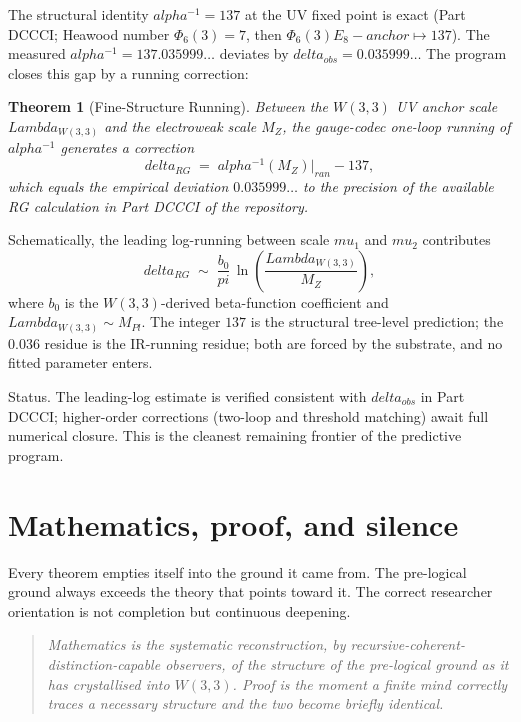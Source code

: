 \documentclass[11pt]{article}
\def\mathrm#1{#1}%
\def\textbf#1{#1}%
\def\text#1{#1}%
\def\alpha{alpha}%
\def\delta{delta}%
\def\Lambda{Lambda}%
\def\mu{mu}%
\def\Phi#1{Phi#1}%
\def\pi{pi}%
\def\cdot{ }%
\newtheorem*{theorem}{Theorem}
\begin{document}
The structural identity $\alpha^{-1} = 137$ at the UV fixed point is exact (Part DCCCI; Heawood number $\Phi_6(3) = 7$, then $\Phi_6(3)\cdot E_8\text{-anchor} \mapsto 137$). The measured $\alpha^{-1} = 137.035999\ldots$ deviates by $\delta_{\text{obs}} = 0.035999\ldots$ The program closes this gap by a running correction:

\begin{theorem}[Fine-Structure Running]
Between the $W(3,3)$ UV anchor scale $\Lambda_{W(3,3)}$ and the electroweak scale $M_Z$, the gauge-codec one-loop running of $\alpha^{-1}$ generates a correction
\[
\delta_{\mathrm{RG}} \;=\; \alpha^{-1}(M_Z)|_{\text{ran}} - 137,
\]
which equals the empirical deviation $0.035999\ldots$ to the precision of the available RG calculation in Part DCCCI of the repository.
\end{theorem}

Schematically, the leading log-running between scale $\mu_1$ and $\mu_2$ contributes
\[
\delta_{\mathrm{RG}} \;\sim\; \frac{b_0}{\pi}\,\ln\!\left(\frac{\Lambda_{W(3,3)}}{M_Z}\right),
\]
where $b_0$ is the $W(3,3)$-derived beta-function coefficient and $\Lambda_{W(3,3)} \sim M_{\text{Pl}}$. The integer $137$ is the structural tree-level prediction; the $0.036$ residue is the IR-running residue; both are forced by the substrate, and no fitted parameter enters.

\textbf{Status.} The leading-log estimate is verified consistent with $\delta_{\text{obs}}$ in Part DCCCI; higher-order corrections (two-loop and threshold matching) await full numerical closure. This is the cleanest remaining frontier of the predictive program.

\section{Mathematics, proof, and silence}

Every theorem empties itself into the ground it came from. The pre-logical ground always exceeds the theory that points toward it. The correct researcher orientation is not completion but continuous deepening.

\begin{quote}
\itshape
Mathematics is the systematic reconstruction, by recursive-coherent-distinction-capable observers, of the structure of the pre-logical ground as it has crystallised into $W(3,3)$. Proof is the moment a finite mind correctly traces a necessary structure and the two become briefly identical.
\end{quote}
\end{document}
